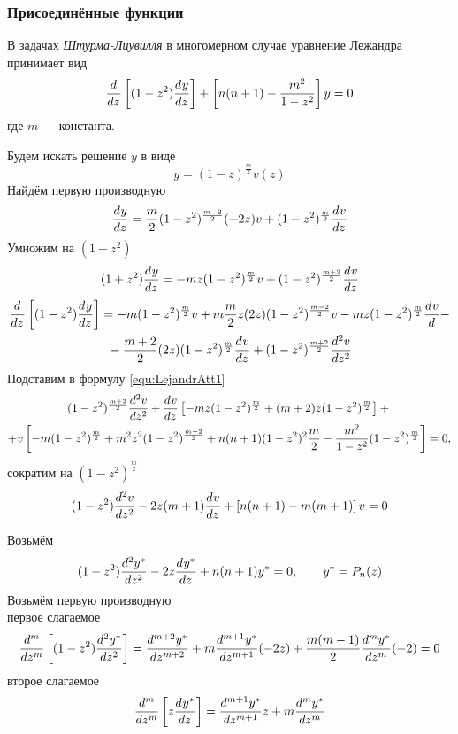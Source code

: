 \subsubsection{Присоединённые функции} \setcounter{equation}{0}
В задачах \textit{Штурма-Лиувилля} в многомерном случае уравнение Лежандра принимает вид
\begin{equation}
    \frac{d^{}}{dz^{}} \left[ (1 - z^2) \frac{d^{}y}{dz^{}} \right] +\left[n(n + 1) - \frac{m^2}{1 - z^2}\right] y = 0
		\label{equ:LejandrAtt1}
\end{equation}
где $m$ --- константа.

Будем искать решение $y$ в виде
\[
    y = (1 - z)^{\frac{m}{2}} v (z)
\]
Найдём первую производную
\[
    \frac{d^{}y}{dz^{}} = \frac{m}{2} (1 - z^2)^{\frac{m - 2}{2}} (- 2 z) v + (1 - z^2)^{\frac{m}{2}} \frac{d^{}v}{dz^{}}
\]
Умножим на $(1 - z^2)$
\[
    (1 + z^2) \frac{d^{}y}{dz^{}} = - m z(1 - z^2)^{\frac{m}{2}} v + (1 - z^2)^{\frac{m + 2}{2}} \frac{d^{}v}{dz^{}}
\]
\begin{multline*}
    \frac{d^{}}{dz^{}} \left[ (1 -z^2) \frac{d^{}y}{dz^{}} \right] = - m (1 - z^2)^{\frac{m}{2}} v + m \frac{m}{2} z (2 z) (1 - z^2)^{\frac{m - 2}{2}} v - mz(1 - z^2)^{\frac{m}{2}} \frac{d^{}v}{d^{}} -\\ {}- \frac{m + 2}{2} (2 z) (1 - z^2)^{\frac{m}{2}} \frac{d^{}v}{dz^{}} + (1 - z^2)^{\frac{m + 2}{2}} \frac{d^{2}v}{dz^{2}}
\end{multline*}
Подставим в формулу  \eqref{equ:LejandrAtt1}
\begin{multline*} 
    (1 - z^2)^{\frac{m + 2}{2}} \frac{d^{2}v}{dz^{2}} + \frac{d^{}v}{dz^{}} \left[ - m z (1 - z^2)^\frac{m}{2} + (m + 2)z (1 - z^2)^\frac{m}{2} \right] +{}
	\\+ v \left[- m (1 - z^2)^\frac{m}{2} + m^2 z^2 (1 - z^2)^\frac{m - 2}{2} + n(n + 1)(1 - z^2)^2\frac{m}{2} - \frac{m^2}{1 - z^2} (1 - z^2)^\frac{m}{2} \right] = 0,
\end{multline*}
сократим на $(1 - z^2)^\frac{m}{2}$ 
\begin{equation}
    (1 -z^2) \frac{d^{2}v}{dz^{2}} - 2 z (m + 1) \frac{d^{}v}{dz^{}} + \left[n(n + 1) - m(m + 1) \right] v = 0
	\label{equ:LejandrAtt2}
\end{equation}

Возьмём
\[
    (1 - z^2)\frac{d^{2}y^*}{dz^{2}} - 2 z \frac{d^{}y^*}{dz^{}} + n(n + 1) y^* = 0, \qquad y^* = P_n(z)
\]
Возьмём первую производную\\
первое слагаемое
\[
    \frac{d^{m}}{dz^{m}} \left[(1 - z^2)\frac{d^{2}y^*}{dz^{2}} \right] = \frac{d^{m + 2}y^*}{dz^{m + 2}} + m \frac{d^{m+1}y^*}{dz^{m+1}} (- 2 z) + \frac{m(m - 1)}{2} \frac{d^{m}y^*}{dz^{m}} (- 2) = 0
\]
второе слагаемое
\[
    \frac{d^{m}}{dz^{m}} \left[z \frac{d^{}y^*}{dz^{}} \right] = \frac{d^{m + 1}y^*}{dz^{m + 1}} z + m \frac{d^{m}y^*}{dz^{m}} 
\]


